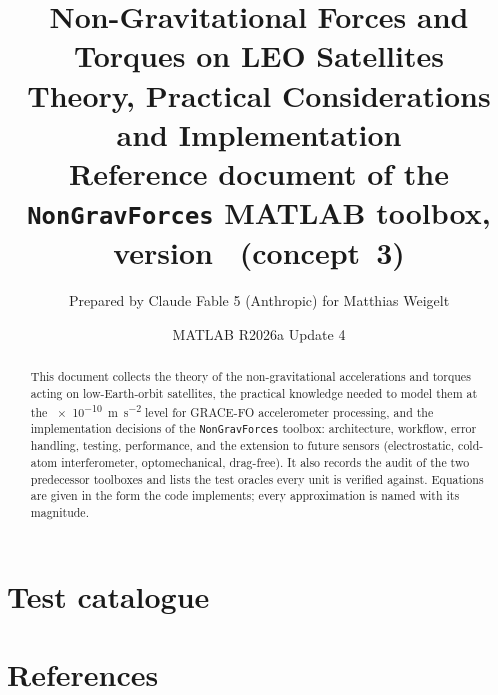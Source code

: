 \documentclass[11pt,a4paper]{article}
\title{Non-Gravitational Forces and Torques on LEO Satellites\\[4pt]\large Theory, Practical Considerations and Implementation\\[2pt]\normalsize Reference document of the \texttt{NonGravForces} MATLAB toolbox, version \ngfversion\ (concept~3)}
\author{Prepared by Claude Fable 5 (Anthropic) for Matthias Weigelt}
\date{\ngfdate \quad\textperiodcentered\quad MATLAB R2026a Update 4}
\begin{document}
\maketitle
\begin{abstract}
This document collects the theory of the non-gravitational accelerations and torques acting on low-Earth-orbit satellites, the practical knowledge needed to model them at the \SI{e-10}{\metre\per\second\squared} level for GRACE-FO accelerometer processing, and the implementation decisions of the \texttt{NonGravForces} toolbox: architecture, workflow, error handling, testing, performance, and the extension to future sensors (electrostatic, cold-atom interferometer, optomechanical, drag-free). It also records the audit of the two predecessor toolboxes and lists the test oracles every unit is verified against. Equations are given in the form the code implements; every approximation is named with its magnitude.
\end{abstract}
\tableofcontents
\clearpage


\appendix
\section{Test catalogue}\label{app:tests}


\section*{References}

\end{document}
